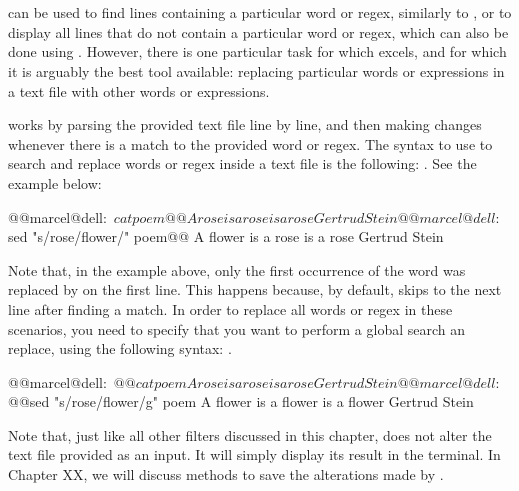 \section{}

 can be used to find lines containing a particular word or \acs{regex}, similarly to , or to display all lines that do not contain a particular word or \acs{regex}, which can also be done using . However, there is one particular task for which  excels, and for which it is arguably the best tool available: replacing particular words or expressions in a text file with other words or expressions.

 works by parsing the provided text file line by line, and then making changes whenever there is a match to the provided word or \acs{regex}. The syntax to use  to search and replace words or \acs{regex} inside a text file is the following: . See the example below:

\begin{command_line}[make]
@@marcel@dell:~$ cat poem@@
A rose is a rose is a rose
Gertrud Stein
@@marcel@dell:~$ sed "s/rose/flower/" poem@@
A flower is a rose is a rose
Gertrud Stein
\end{command_line}

Note that, in the example above, only the first occurrence of the word  was replaced by  on the first line. This happens because, by default,  skips to the next line after finding a match. In order to replace all words or \acs{regex} in these scenarios, you need to specify that you want to perform a global search an replace, using the following syntax: .

\begin{command_line}[make]
@@marcel@dell:~$ @@cat poem
A rose is a rose is a rose
Gertrud Stein
@@marcel@dell:~$ @@sed "s/rose/flower/g" poem
A flower is a flower is a flower
Gertrud Stein
\end{command_line}

Note that, just like all other filters discussed in this chapter,  does not alter the text file provided as an input. It will simply display its result in the terminal. In Chapter XX, we will discuss methods to save the alterations made by .

